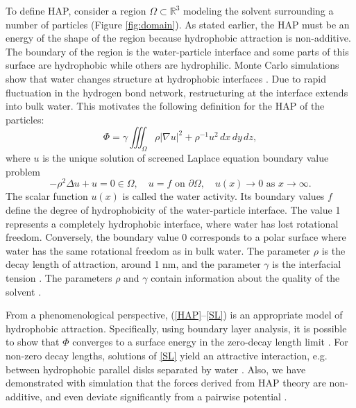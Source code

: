 To define HAP, consider a region $\Omega \subset \mathbb{R}^3$  
modeling the solvent surrounding a number of particles (Figure \ref{fig:domain}).
As stated earlier, the HAP must be an energy of the shape of the region
because hydrophobic attraction is non-additive. 
The boundary of the region is the water-particle interface and some parts of this
surface are hydrophobic while others are hydrophilic. 
Monte Carlo simulations 
show that water changes structure at hydrophobic interfaces \cite{Luzar1987, Jonsson2006,Varilly2011}.
Due to rapid fluctuation in the hydrogen bond network,
restructuring at the interface extends into bulk water.
This motivates the following definition for the HAP of the particles:
\begin{equation}
\label{HAP}
  \Phi = \gamma \iiint_{\Omega} \rho |\nabla u|^2 + \rho^{-1}u^2 \,dx \,dy \,dz, 
\end{equation}
where $u$ is the unique solution of screened Laplace equation boundary value problem 
\begin{equation}
  \label{SL}
  -\rho^2 \Delta u + u = 0 \in \Omega,\quad u = f  \mbox{ on } \partial \Omega, \quad u(x) \to 0 \mbox{ as } x \to \infty.
\end{equation}
The scalar function $u(x)$ is called the water activity. Its boundary values $f$ 
define the degree of hydrophobicity of the water-particle interface. The value 
1 represents a completely hydrophobic interface, where water has lost rotational freedom. 
Conversely, the boundary value 0 corresponds to a polar surface where water has the same rotational
freedom as in bulk water. The parameter $\rho$ is the decay length of attraction, 
around 1 nm, and the parameter $\gamma$ is the interfacial tension \cite{Israelachvili1954}.
The parameters $\rho$ and $\gamma$ contain information about the quality
of the solvent \cite{Discher2002}.

From a phenomenological perspective, (\ref{HAP}--\ref{SL}) 
is an appropriate model of hydrophobic attraction. Specifically,
using boundary layer analysis, it is possible 
to show that $\Phi$ converges to a surface energy in the zero-decay length limit \cite{Lee2018,Lin2015,Shibata2004}.
For non-zero decay lengths, solutions of \eqref{SL} yield an attractive interaction, e.g. between hydrophobic parallel disks
separated by water \cite{Eriksson1989}. Also, we have demonstrated with simulation that the forces 
derived from HAP theory are non-additive, and even deviate significantly from 
a pairwise potential \cite{Meyer2006,Fu2018_SIAM}. 


